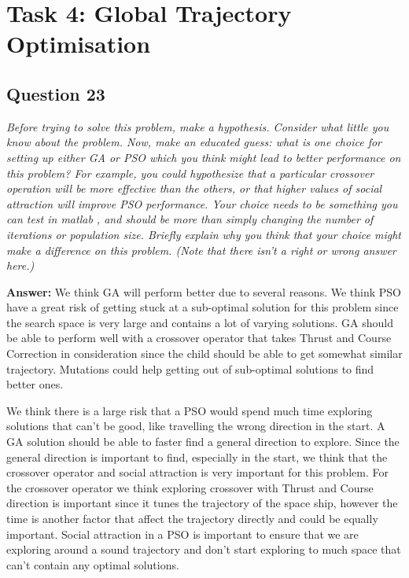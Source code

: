 \documentclass[a4paper]{article}
\begin{document}
\section*{Task 4: Global Trajectory Optimisation}

\subsection*{Question 23}
\emph{Before trying to solve this problem, make a hypothesis. Consider what little you know about the problem. Now, make an educated guess: what is one choice for setting up either GA or PSO which you think might lead to better performance on this problem? For example, you could hypothesize that a particular crossover operation will be more effective than the others, or that higher values of social attraction will improve PSO performance. Your choice needs to be something you can test in matlab , and should be more than simply changing the number of iterations or population size. Briefly explain why you
think that your choice might make a difference on this problem. (Note that there isn’t a right or wrong answer here.)}

\textbf{Answer:} We think GA will perform better due to several reasons. We think PSO have a great risk of getting stuck at a sub-optimal solution for this problem since the search space is very large and contains a lot of varying solutions. GA should be able to perform well with a crossover operator that takes Thrust and Course Correction in consideration since the child should be able to get somewhat similar trajectory. Mutations could help getting out of sub-optimal solutions to find better ones.

We think there is a large risk that a PSO would spend much time exploring solutions that can't be good, like travelling the wrong direction in the start. A GA solution should be able to faster find a general direction to explore. 
Since the general direction is important to find, especially in the start, we think that the crossover operator and social attraction is very important for this problem. For the crossover operator we think exploring crossover with Thrust and Course direction is important since it tunes the trajectory of the space ship, however the time is another factor that affect the trajectory directly and could be equally important.
Social attraction in a PSO is important to ensure that we are exploring around a sound trajectory and don't start exploring to much space that can't contain any optimal solutions. 
\end{document}

